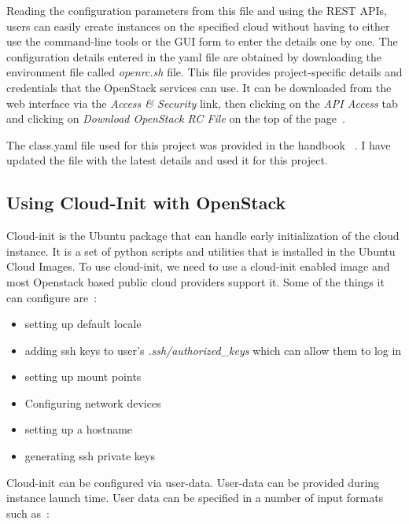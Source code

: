 Reading the configuration parameters from this file and using the REST APIs,
users can easily create instances on the specified cloud without having to
either use the command-line tools or the GUI form to enter the details one by
one. The configuration details entered in the yaml file are obtained by
downloading the environment file called \textit{openrc.sh} file. This file 
provides project-specific details and credentials that the OpenStack services 
can use. It can be downloaded from the web interface via the 
\textit{Access \& Security} link, then clicking on the 
\textit{API Access} tab and clicking on \textit{Download OpenStack RC File} 
on the top of the page~\cite{hid-sp18-516-www-openrc}. 

The class.yaml file used for this project was provided in the handbook
~\cite{hid-sp18-516-las-handbook}. I have updated the file with the latest 
details and used it for this project. 

\subsection{Using Cloud-Init with OpenStack}
Cloud-init is the Ubuntu package that can handle early initialization of the
cloud instance. It is a set of python scripts and utilities that is installed 
in the Ubuntu Cloud Images. To use cloud-init, we need to use a cloud-init 
enabled image and most Openstack based public cloud providers support it. 
Some of the things it can configure are~\cite{hid-sp18-516-www-cloud-init}:

\begin{itemize}
\item setting up default locale
\item adding ssh keys to user's \textit{.ssh/authorized\_keys} which can 
allow them to log in
\item setting up mount points
\item Configuring network devices
\item setting up a hostname
\item generating ssh private keys
\end{itemize}

Cloud-init can be configured via user-data. User-data can be provided during
instance launch time. User data can be specified in a number of input formats
such as~\cite{hid-sp18-516-www-cloud-init}:

